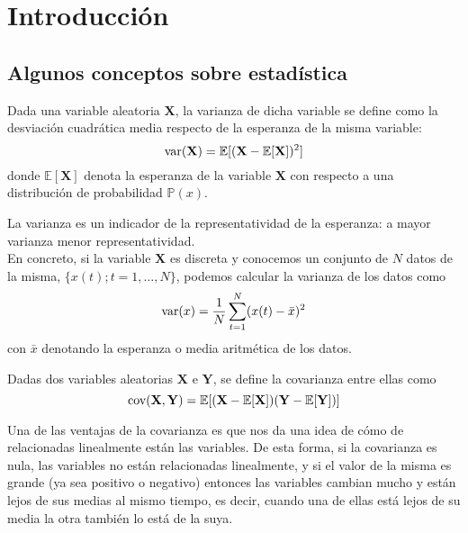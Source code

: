 %
%


\chapter{Introducción}
\setcounter{page}{1}

\section{Algunos conceptos sobre estadística}

\begin{definicion}[Varianza]
	Dada una variable aleatoria $\mathbf{X}$, la varianza de dicha variable se define como la desviación cuadrática media respecto de la esperanza de la misma variable:
	\[	\text{var}{(\mathbf{X})} = \mathbb{E}[(\mathbf{X} - \mathbb{E}[\mathbf{X}])^2]	\]
	donde $\mathbb{E}[\mathbf{X}]$ denota la esperanza de la variable $\mathbf{X}$ con respecto a una distribución de probabilidad $\mathbb{P}(x)$.
\end{definicion}

La varianza es un indicador de la representatividad de la esperanza: a mayor varianza menor representatividad.\\

En concreto, si la variable $\mathbf{X}$ es discreta y conocemos un conjunto de $N$ datos de la misma, $\{x(t); t=1,\dots,N\}$, podemos calcular la varianza de los datos como 
\[	\text{var}{(x)} = \frac{1}{N} \sum_{t=1}^N(x(t)-\bar{x})^2	\]
con $\bar{x}$ denotando la esperanza o media aritmética de los datos.

\begin{definicion}[Covarianza]
	Dadas dos variables aleatorias $\mathbf{X}$ e $\mathbf{Y}$, se define la covarianza entre ellas como
	\[	\text{cov}{(\mathbf{X}, \mathbf{Y})} = \mathbb{E}[(\mathbf{X}-\mathbb{E}[\mathbf{X}])(\mathbf{Y}-\mathbb{E}[\mathbf{Y}])]	\]
\end{definicion}

Una de las ventajas de la covarianza es que nos da una idea de cómo de relacionadas linealmente están las variables. De esta forma, si la covarianza es nula, las variables no están relacionadas linealmente, y si el valor de la misma es grande (ya sea positivo o negativo) entonces las variables cambian mucho y están lejos de sus medias al mismo tiempo, es decir, cuando una de ellas está lejos de su media la otra también lo está de la suya.

